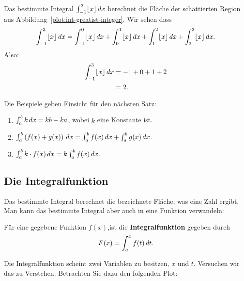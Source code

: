 \begin{solution}
Das bestimmte Integral $\int_{-1}^3 \lfloor x\rfloor \, d x$ berechnet die Fläche der schattierten Region aus Abbildung~\ref{plot:int-greatist-integer}. Wir sehen dass
\[
\int_{-1}^3 \lfloor x\rfloor \, d x = 
\int_{-1}^0 \lfloor x\rfloor \, d x + \int_{0}^1 \lfloor x\rfloor \, d x + \int_{1}^2 \lfloor x\rfloor \, d x + \int_{2}^3 \lfloor x\rfloor \, d x.
\]
Also:
\begin{align*}
\int_{-1}^3 \lfloor x\rfloor \, d x &= -1 + 0 + 1+2 \\
&= 2.
\end{align*}
\end{solution}

Die Beispiele geben Einsicht für den nächsten Satz:

\begin{mainTheorem}
\begin{enumerate}
\item $\int_a^b k \, d x= kb-ka$, wobei $k$ eine Konstante ist.
\item $\int_a^b \left( f(x) + g(x) \right) \, d x = \int_a^b f(x) \, d x + \int_a^b
  g(x) \, d x$.
\item $\int_a^b k \cdot f(x) \, d x = k \int_a^b f(x) \, d x$.
\end{enumerate}
\end{mainTheorem}


\subsection*{Die Integralfunktion}
Das bestimmte Integral berechnet die bezeichnete Fläche, was eine Zahl ergibt. Man kann das bestimmte Integral aber auch in eine Funktion verwandeln:
\begin{definition}
Für eine gegebene Funktion $f(x)$,ist die \textbf{Integralfunktion} gegeben durch 
\[
F(x) = \int_a^x f(t) \, d t.
\]
\end{definition}

Die Integralfunktion scheint zwei Variablen zu besitzen, $x$ und $t$. Versuchen wir das zu Verstehen. Betrachten Sie dazu den folgenden Plot:

